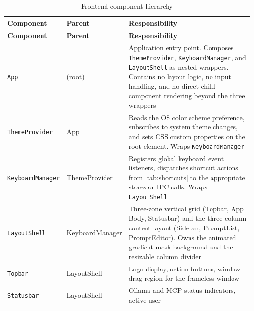 \documentclass[a4paper, 11pt, oneside]{report}
\begin{document}
\begin{longtable}{l l L{7.5cm}}
  \caption{Frontend component hierarchy}
  \label{tab:components} \\
  \toprule
  \textbf{Component} & \textbf{Parent} & \textbf{Responsibility} \\
  \midrule
  \endfirsthead
  \toprule
  \textbf{Component} & \textbf{Parent} & \textbf{Responsibility} \\
  \midrule
  \endhead
  \texttt{App}              & (root)            & Application entry point.  Composes
                                                   \texttt{ThemeProvider}, \texttt{KeyboardManager},
                                                   and \texttt{LayoutShell} as nested wrappers.
                                                   Contains no layout logic, no input handling,
                                                   and no direct child component rendering beyond
                                                   the three wrappers \\
  \texttt{ThemeProvider}    & App               & Reads the OS color scheme preference, subscribes
                                                   to system theme changes, and sets CSS custom
                                                   properties on the root element.  Wraps
                                                   \texttt{KeyboardManager} \\
  \texttt{KeyboardManager}  & ThemeProvider      & Registers global keyboard event listeners,
                                                   dispatches shortcut actions from
                                                   \cref{tab:shortcuts} to the appropriate stores
                                                   or IPC calls.  Wraps \texttt{LayoutShell} \\
  \texttt{LayoutShell}      & KeyboardManager    & Three-zone vertical grid (Topbar, App Body,
                                                   Statusbar) and the three-column content layout
                                                   (Sidebar, PromptList, PromptEditor).  Owns
                                                   the animated gradient mesh background and the
                                                   resizable column divider \\
  \texttt{Topbar}           & LayoutShell       & Logo display, action buttons, window drag region
                                                   for the frameless window \\
  \texttt{Statusbar}        & LayoutShell       & Ollama and MCP status indicators, active user

\end{longtable}
\end{document}
